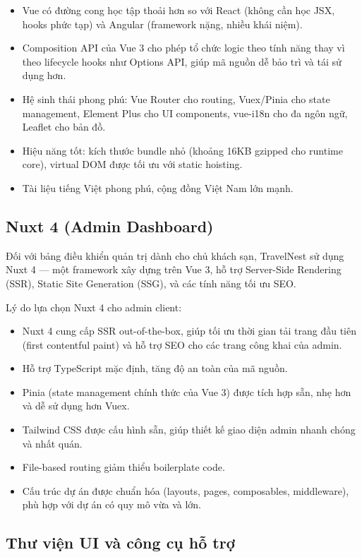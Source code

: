 \documentclass[13pt,a4paper,twoside]{report}
\begin{document}
\begin{itemize}
  \item Vue có đường cong học tập thoải hơn so với React (không cần học JSX, hooks phức tạp) và Angular (framework nặng, nhiều khái niệm).
  \item Composition API của Vue 3 cho phép tổ chức logic theo tính năng thay vì theo lifecycle hooks như Options API, giúp mã nguồn dễ bảo trì và tái sử dụng hơn.
  \item Hệ sinh thái phong phú: Vue Router cho routing, Vuex/Pinia cho state management, Element Plus cho UI components, vue-i18n cho đa ngôn ngữ, Leaflet cho bản đồ.
  \item Hiệu năng tốt: kích thước bundle nhỏ (khoảng 16KB gzipped cho runtime core), virtual DOM được tối ưu với static hoisting.
  \item Tài liệu tiếng Việt phong phú, cộng đồng Việt Nam lớn mạnh.
\end{itemize}

\subsection{Nuxt 4 (Admin Dashboard)}

Đối với bảng điều khiển quản trị dành cho chủ khách sạn, TravelNest sử dụng Nuxt 4 --- một framework xây dựng trên Vue 3, hỗ trợ Server-Side Rendering (SSR), Static Site Generation (SSG), và các tính năng tối ưu SEO.

Lý do lựa chọn Nuxt 4 cho admin client:

\begin{itemize}
  \item Nuxt 4 cung cấp SSR out-of-the-box, giúp tối ưu thời gian tải trang đầu tiên (first contentful paint) và hỗ trợ SEO cho các trang công khai của admin.
  \item Hỗ trợ TypeScript mặc định, tăng độ an toàn của mã nguồn.
  \item Pinia (state management chính thức của Vue 3) được tích hợp sẵn, nhẹ hơn và dễ sử dụng hơn Vuex.
  \item Tailwind CSS được cấu hình sẵn, giúp thiết kế giao diện admin nhanh chóng và nhất quán.
  \item File-based routing giảm thiểu boilerplate code.
  \item Cấu trúc dự án được chuẩn hóa (layouts, pages, composables, middleware), phù hợp với dự án có quy mô vừa và lớn.
\end{itemize}

\subsection{Thư viện UI và công cụ hỗ trợ}
\end{document}
